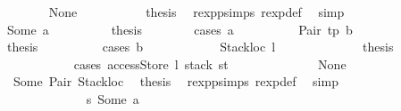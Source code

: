 \begin{isabellebody}
\ \ \ \ \ \ \isamarkupfalse%
\ None\isanewline
\ \ \ \ \ \ \isamarkupfalse%
\ {}{}{\isacharparenleft}{\kern0pt}{}{\isacharparenright}{\kern0pt}\ \isamarkupfalse%
\ {\isacharquery}{\kern0pt}thesis\ \isamarkupfalse%
\ rexp{\isachardot}{\kern0pt}psimps\ rexp{\isacharunderscore}{\kern0pt}def\ \isamarkupfalse%
\ simp\isanewline
\ \ \ \ \isamarkupfalse%
\isanewline
\ \ \ \ \ \ \isamarkupfalse%
\ {\isacharparenleft}{\kern0pt}Some\ a{\isacharparenright}{\kern0pt}\isanewline
\ \ \ \ \ \ \isamarkupfalse%
\ \isamarkupfalse%
\ {\isacharquery}{\kern0pt}thesis\isanewline
\ \ \ \ \ \ \isamarkupfalse%
\ {\isacharparenleft}{\kern0pt}cases\ a{\isacharparenright}{\kern0pt}\isanewline
\ \ \ \ \ \ \ \ \isamarkupfalse%
\ {\isacharparenleft}{\kern0pt}Pair\ tp\ b{\isacharparenright}{\kern0pt}\isanewline
\ \ \ \ \ \ \ \ \isamarkupfalse%
\ \isamarkupfalse%
\ {\isacharquery}{\kern0pt}thesis\isanewline
\ \ \ \ \ \ \ \ \isamarkupfalse%
\ {\isacharparenleft}{\kern0pt}cases\ b{\isacharparenright}{\kern0pt}\isanewline
\ \ \ \ \ \ \ \ \ \ \isamarkupfalse%
\ {\isacharparenleft}{\kern0pt}Stackloc\ l{\isacharparenright}{\kern0pt}\isanewline
\ \ \ \ \ \ \ \ \ \ \isamarkupfalse%
\ \isamarkupfalse%
\ {\isacharquery}{\kern0pt}thesis\isanewline
\ \ \ \ \ \ \ \ \ \ \isamarkupfalse%
\ {\isacharparenleft}{\kern0pt}cases\ {\isachardoublequoteopen}accessStore\ l\ {\isacharparenleft}{\kern0pt}stack\ st{\isacharparenright}{\kern0pt}{\isachardoublequoteclose}{\isacharparenright}{\kern0pt}\isanewline
\ \ \ \ \ \ \ \ \ \ \ \ \isamarkupfalse%
\ None\isanewline
\ \ \ \ \ \ \ \ \ \ \ \ \isamarkupfalse%
\ {}{}{\isacharparenleft}{\kern0pt}{}{\isacharparenright}{\kern0pt}\ Some\ Pair\ Stackloc\ \isamarkupfalse%
\ {\isacharquery}{\kern0pt}thesis\ \isamarkupfalse%
\ rexp{\isachardot}{\kern0pt}psimps{\isacharparenleft}{\kern0pt}{}{\isacharparenright}{\kern0pt}\ rexp{\isacharunderscore}{\kern0pt}def\ \isamarkupfalse%
\ simp\isanewline
\ \ \ \ \ \ \ \ \ \ \isamarkupfalse%
\isanewline
\ \ \ \ \ \ \ \ \ \ \ \ \isamarkupfalse%
\ s{}{\isacharcolon}{\kern0pt}\ {\isacharparenleft}{\kern0pt}Some\ a{\isacharparenright}{\kern0pt}\isanewline

\end{isabellebody}
